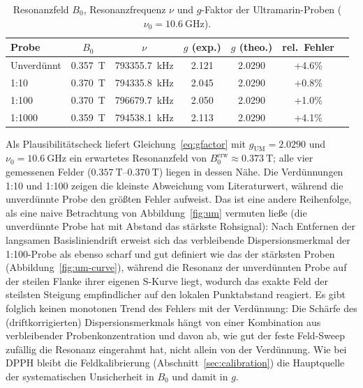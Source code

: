 \documentclass[11pt,a4paper]{article}
\begin{document}
\begin{table}[ht]
    \centering
    \caption{Resonanzfeld $B_0$, Resonanzfrequenz $\nu$ und $g$-Faktor der
             Ultramarin-Proben ($\nu_0 = \SI{10.6}{\giga\hertz}$).}
    \label{tab:um}
    \begin{tabular}{lcccccc}
        \toprule
        Probe & $B_0$ & $\nu$ & $g$ (exp.) & $g$ (theo.) & rel.\ Fehler \\
        \midrule
        Unverdünnt & \SI{0.357}{\tesla} & \SI{793355.7}{\kilo\hertz} & 2.121 & 2.0290 & +4.6\% \\
        1:10       & \SI{0.370}{\tesla} & \SI{794335.8}{\kilo\hertz} & 2.045 & 2.0290 & +0.8\% \\
        1:100      & \SI{0.370}{\tesla} & \SI{796679.7}{\kilo\hertz} & 2.050 & 2.0290 & +1.0\% \\
        1:1000     & \SI{0.359}{\tesla} & \SI{794538.1}{\kilo\hertz} & 2.113 & 2.0290 & +4.1\% \\
        \bottomrule
    \end{tabular}
\end{table}

\label{sec:um-diskussion}
Als Plausibilitätscheck liefert Gleichung~\eqref{eq:gfactor} mit
$g_{\text{UM}} = 2.0290$ und $\nu_0 = \SI{10.6}{\giga\hertz}$ ein erwartetes
Resonanzfeld von $B_0^{\text{erw}} \approx \SI{0.373}{\tesla}$; alle vier
gemessenen Felder ($\SIrange{0.357}{0.370}{\tesla}$) liegen in dessen Nähe.
Die Verdünnungen 1:10 und 1:100 zeigen die kleinste Abweichung vom
Literaturwert, während die unverdünnte Probe den größten Fehler aufweist. Das
ist eine andere Reihenfolge, als eine naive Betrachtung von
Abbildung~\ref{fig:um} vermuten ließe (die unverdünnte Probe hat mit Abstand
das stärkste Rohsignal): Nach Entfernen der langsamen Basisliniendrift
erweist sich das verbleibende Dispersionsmerkmal der 1:100-Probe als ebenso
scharf und gut definiert wie das der stärksten Proben
(Abbildung~\ref{fig:um-curve}), während die Resonanz der unverdünnten Probe
auf der steilen Flanke ihrer eigenen S-Kurve liegt, wodurch das exakte Feld
der steilsten Steigung empfindlicher auf den lokalen Punktabstand reagiert.
Es gibt folglich keinen monotonen Trend des Fehlers mit der Verdünnung: Die
Schärfe des (driftkorrigierten) Dispersionsmerkmals hängt von einer
Kombination aus verbleibender Probenkonzentration und davon ab, wie gut der
feste Feld-Sweep zufällig die Resonanz eingerahmt hat, nicht allein von der
Verdünnung. Wie bei DPPH bleibt die Feldkalibrierung
(Abschnitt~\ref{sec:calibration}) die Hauptquelle der systematischen
Unsicherheit in $B_0$ und damit in $g$.
\end{document}
